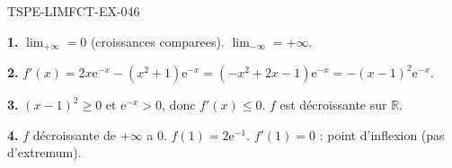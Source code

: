 \begin{corrige}{TSPE-LIMFCT-EX-046}

\textbf{1.} $\lim_{+\infty} = 0$ (croissances comparees). $\lim_{-\infty} = +\infty$.

\textbf{2.} $f'(x) = 2x\mathrm{e}^{-x} - (x^2+1)\mathrm{e}^{-x} = (-x^2+2x-1)\mathrm{e}^{-x} = -(x-1)^2\mathrm{e}^{-x}$.

\textbf{3.} $(x-1)^2 \geq 0$ et $\mathrm{e}^{-x} > 0$, donc $f'(x) \leq 0$. $f$ est décroissante sur $\mathbb{R}$.

\textbf{4.} $f$ décroissante de $+\infty$ a $0$. $f(1) = 2\mathrm{e}^{-1}$. $f'(1) = 0$ : point d'inflexion (pas d'extremum).

\end{corrige}
